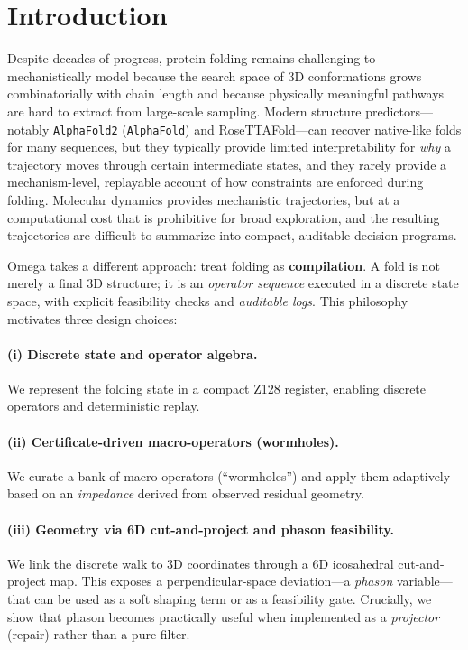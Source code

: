 \section{Introduction}

Despite decades of progress, protein folding remains challenging to mechanistically model because the search space of 3D conformations grows combinatorially with chain length and because physically meaningful pathways are hard to extract from large-scale sampling. Modern structure predictors---notably \texttt{AlphaFold2} (\texttt{AlphaFold}) and RoseTTAFold---can recover native-like folds for many sequences, but they typically provide limited interpretability for \emph{why} a trajectory moves through certain intermediate states, and they rarely provide a mechanism-level, replayable account of how constraints are enforced during folding. Molecular dynamics provides mechanistic trajectories, but at a computational cost that is prohibitive for broad exploration, and the resulting trajectories are difficult to summarize into compact, auditable decision programs.

Omega takes a different approach: treat folding as \textbf{compilation}. A fold is not merely a final 3D structure; it is an \emph{operator sequence} executed in a discrete state space, with explicit feasibility checks and \emph{auditable logs}. This philosophy motivates three design choices:

\paragraph{(i) Discrete state and operator algebra.}
We represent the folding state in a compact Z128 register, enabling discrete operators and deterministic replay.

\paragraph{(ii) Certificate-driven macro-operators (wormholes).}
We curate a bank of macro-operators (``wormholes'') and apply them adaptively based on an \emph{impedance} derived from observed residual geometry.

\paragraph{(iii) Geometry via 6D cut-and-project and phason feasibility.}
We link the discrete walk to 3D coordinates through a 6D icosahedral cut-and-project map. This exposes a perpendicular-space deviation—a \emph{phason} variable—that can be used as a soft shaping term or as a feasibility gate. Crucially, we show that phason becomes practically useful when implemented as a \emph{projector} (repair) rather than a pure filter.

